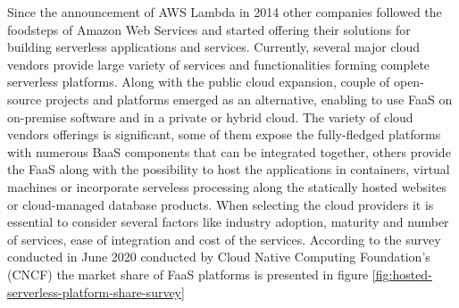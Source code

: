 Since the announcement of AWS Lambda in 2014 other companies followed the foodsteps of Amazon Web Services and started offering their solutions for building serverless applications and services. Currently, several major cloud vendors provide large variety of services and functionalities forming complete serverless platforms. Along with the public cloud expansion, couple of open-source projects and platforms emerged as an alternative, enabling to use FaaS on on-premise software and in a private or hybrid cloud. The variety of cloud vendors offerings is significant, some of them expose the fully-fledged platforms with numerous BaaS components that can be integrated together, others provide the FaaS along with the possibility to host the applications in containers, virtual machines or incorporate serveless processing along the statically hosted websites or cloud-managed database products. When selecting the cloud providers it is essential to consider several factors like industry adoption, maturity and number of services, ease of integration and cost of the services. According to the survey conducted in June 2020 conducted by Cloud Native Computing Foundation's (CNCF) \cite{CNCFServerlessSurvey2020} the market share of FaaS platforms is presented in figure \ref{fig:hosted-serverless-platform-share-survey}



